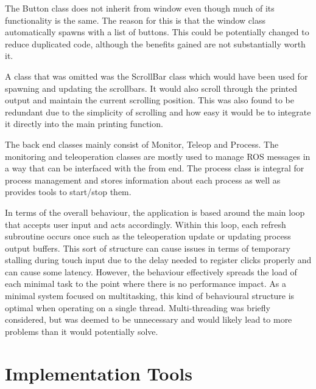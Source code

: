 The Button class does not inherit from window even though much of its functionality is the same. The reason for this is that the window class automatically spawns with a list of buttons. This could be potentially changed to reduce duplicated code, although the benefits gained are not substantially worth it.

A class that was omitted was the ScrollBar class which would have been used for spawning and updating the scrollbars. It would also scroll through the printed output and maintain the current scrolling position. This was also found to be redundant due to the simplicity of scrolling and how easy it would be to integrate it directly into the main printing function.

The back end classes mainly consist of Monitor, Teleop and Process. The monitoring and teleoperation classes are mostly used to manage {\selectfont ROS} messages in a way that can be interfaced with the from end. The process class is integral for process management and stores information about each process as well as provides tools to start/stop them.

In terms of the overall behaviour, the application is based around the main loop that accepts user input and acts accordingly. Within this loop, each refresh subroutine occurs once such as the teleoperation update or updating process output buffers. This sort of structure can cause issues in terms of temporary stalling during touch input due to the delay needed to register clicks properly and can cause some latency. However, the behaviour effectively spreads the load of each minimal task to the point where there is no performance impact. As a minimal system focused on multitasking, this kind of behavioural structure is optimal when operating on a single thread. Multi-threading was briefly considered, but was deemed to be unnecessary and would likely lead to more problems than it would potentially solve.

\section{Implementation Tools}
\label{implementation_tools}

